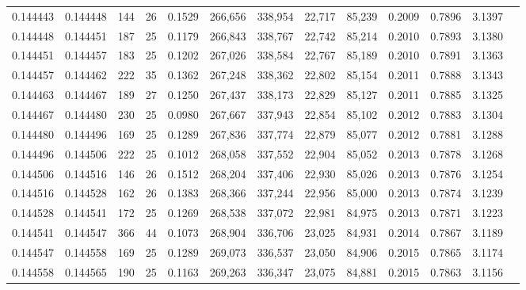 \begin{tabular}{rrrrrrrrrrrrr}
0.144443 & 0.144448 & 144 &  26 &                                     0.1529 & 266,656 & 338,954 &  22,717 &  85,239 & 0.2009 & 0.7896 & 3.1397 \\
0.144448 & 0.144451 & 187 &  25 &                                     0.1179 & 266,843 & 338,767 &  22,742 &  85,214 & 0.2010 & 0.7893 & 3.1380 \\
0.144451 & 0.144457 & 183 &  25 &                                     0.1202 & 267,026 & 338,584 &  22,767 &  85,189 & 0.2010 & 0.7891 & 3.1363 \\
0.144457 & 0.144462 & 222 &  35 &                                     0.1362 & 267,248 & 338,362 &  22,802 &  85,154 & 0.2011 & 0.7888 & 3.1343 \\
0.144463 & 0.144467 & 189 &  27 &                                     0.1250 & 267,437 & 338,173 &  22,829 &  85,127 & 0.2011 & 0.7885 & 3.1325 \\
0.144467 & 0.144480 & 230 &  25 &                                     0.0980 & 267,667 & 337,943 &  22,854 &  85,102 & 0.2012 & 0.7883 & 3.1304 \\
0.144480 & 0.144496 & 169 &  25 &                                     0.1289 & 267,836 & 337,774 &  22,879 &  85,077 & 0.2012 & 0.7881 & 3.1288 \\
0.144496 & 0.144506 & 222 &  25 &                                     0.1012 & 268,058 & 337,552 &  22,904 &  85,052 & 0.2013 & 0.7878 & 3.1268 \\
0.144506 & 0.144516 & 146 &  26 &                                     0.1512 & 268,204 & 337,406 &  22,930 &  85,026 & 0.2013 & 0.7876 & 3.1254 \\
0.144516 & 0.144528 & 162 &  26 &                                     0.1383 & 268,366 & 337,244 &  22,956 &  85,000 & 0.2013 & 0.7874 & 3.1239 \\
0.144528 & 0.144541 & 172 &  25 &                                     0.1269 & 268,538 & 337,072 &  22,981 &  84,975 & 0.2013 & 0.7871 & 3.1223 \\
0.144541 & 0.144547 & 366 &  44 &                                     0.1073 & 268,904 & 336,706 &  23,025 &  84,931 & 0.2014 & 0.7867 & 3.1189 \\
0.144547 & 0.144558 & 169 &  25 &                                     0.1289 & 269,073 & 336,537 &  23,050 &  84,906 & 0.2015 & 0.7865 & 3.1174 \\
0.144558 & 0.144565 & 190 &  25 &                                     0.1163 & 269,263 & 336,347 &  23,075 &  84,881 & 0.2015 & 0.7863 & 3.1156 \\

\end{tabular}
